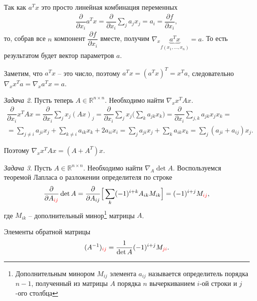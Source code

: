 \documentclass[%
	11pt,
	a4paper,
	utf8,
		]{article}
\begin{document}
Так как $ a^T x $ это просто линейная комбинация переменных
\begin{align*}
	\dfrac{ \partial }{ \partial x_i } a^T x = \dfrac{ \partial }{ \partial x_i } \sum_j a_j x_j = a_i = \dfrac{ \partial f }{\partial x_i},
\end{align*}
то, собрав все $ n $ компонент $ \dfrac{ \partial f }{ \partial x_i } $ вместе, получим $ \nabla_x \underbrace{a^T x}_{f(x_1, \ldots, x_n)} = a $. То есть результатом будет вектор параметров $ a $.

Заметим, что $ a^T x $ -- это число, поэтому $ a^T x = (a^T x)^T = x^T a $, следовательно $\boxed{\nabla_x x^T a = \nabla_x a^T x = a} $.

\vspace*{3mm}\emph{Задача 2}. Пусть теперь $ A \in \mathbb{R}^{n \times n} $. Необходимо найти $ \nabla_x x^T A x $.
\begin{multline*}
	\dfrac{ \partial }{ \partial x_i } x^T A x = \dfrac{ \partial }{ \partial x_i } \sum_{j} x_j (A x)_j = \dfrac{ \partial }{ \partial x_i} \sum_{j} x_j \Big( \sum_k a_{jk} x_k \Big) = \dfrac{ \partial }{ \partial x_i } \sum_{j,k} a_{jk} x_j x_k = \\
	= \sum_{j \neq i} a_{ji} x_j + \sum_{k \neq i} a_{ik} x_k + 2 a_{ii} x_i = \sum_j a_{ji} x_j + \sum_k a_{ik} x_k = \sum_j (a_{ji} + a_{ij}) x_j.
\end{multline*}

Поэтому $ \boxed{\nabla_x x^T A x = (A + A^T) x} $.

\vspace*{3mm}\emph{Задача 3}. Пусть $ A \in \mathbb{R}^{n \times n} $. Необходимо найти $ \nabla_A \det A $. Воспользуемся теоремой Лапласа о разложении определителя по строке
\begin{align*}
	\dfrac{ \partial }{ \partial A_{\color{red}ij} } \det A = \dfrac{ \partial }{ \partial A_{ij} } \Big[ \sum_k (-1)^{i + k} A_{ik} M_{ik} \Big] = (-1)^{i + j} M_{\color{red}ij},
\end{align*}
где $ M_{ik} $ -- дополнительный минор\footnote{Дополнительным минором $ M_{ij} $ элемента $ a_{ij} $ называется определитель порядка $ n - 1 $, полученный из матрицы $ A $ порядка $ n $ вычеркиванием $ i $-ой строки и $ j $-ого столбца} матрицы $ A $. 

Элементы обратной матрицы
\begin{align*}
	(A^{-1})_{\color{red}ij} = \dfrac{1}{ \det A } (-1)^{i + j} M_{\color{red}ji}.
\end{align*}
\end{document}
